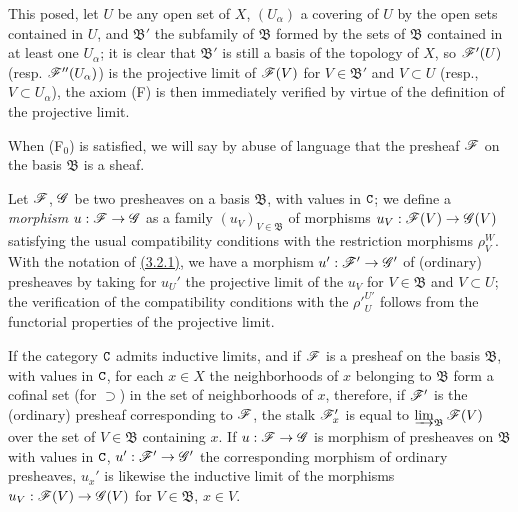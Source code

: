 \begin{env}[3.2.2]
This posed, let $U$ be any open set of $X$, $(U_\alpha)$ a covering of $U$ by
the open sets contained in $U$, and $\mathfrak{B}'$ the subfamily of
$\mathfrak{B}$ formed by the sets
of $\mathfrak{B}$ contained in at least one $U_\alpha$; it is clear that
$\mathfrak{B}'$ is still a basis of the topology of $X$, so $\mathscr{F}'(U)$
(resp. $\mathscr{F}''(U_\alpha)$) is the projective limit of $\mathscr{F}(V)$ for
$V\in\mathfrak{B}'$ and $V\subset U$ (resp., $V\subset U_\alpha$), the axiom (F)
is then immediately verified by virtue of the definition of the projective
limit.

When (F$_0$) is satisfied, we will say by abuse of language that the presheaf
$\mathscr{F}$ on the basis $\mathfrak{B}$ is a sheaf.
\end{env}

\begin{env}[3.2.3]
\label{env-0.3.2.3}
Let $\mathscr{F}$, $\mathscr{G}$ be two presheaves on a basis $\mathfrak{B}$, with values
in $\mathtt{C}$; we define a {\em morphism} $u:\mathscr{F}\to\mathscr{G}$ as a family
$(u_V)_{V\in\mathfrak{B}}$ of morphisms $u_V:\mathscr{F}(V)\to\mathscr{G}(V)$ satisfying
the usual compatibility conditions with the restriction morphisms $\rho_V^W$.
With the notation of \hyperref[env-0.3.2.1]{(3.2.1)}, we have a morphism
$u':\mathscr{F}'\to\mathscr{G}'$ of (ordinary) presheaves by taking for $u_U'$ the
projective limit of the $u_V$ for $V\in\mathfrak{B}$ and $V\subset U$; the
verification of the compatibility conditions with the ${\rho'}_U^{U'}$ follows
from the functorial properties of the projective limit.
\end{env}

\begin{env}[3.2.4]
\label{env-0.3.2.4}
If the category $\mathtt{C}$ admits inductive limits, and if $\mathscr{F}$ is a presheaf on
the basis $\mathfrak{B}$, with values in $\mathtt{C}$, for each $x\in X$ the
neighborhoods of $x$ belonging to $\mathfrak{B}$ form a cofinal set
(for $\supset$) in the set of neighborhoods of $x$, therefore, if $\mathscr{F}'$ is
the (ordinary) presheaf corresponding to $\mathscr{F}$, the stalk $\mathscr{F}_x'$ is
equal to $\varinjlim_{\mathfrak{B}}\mathscr{F}(V)$ over the set of $V\in\mathfrak{B}$
containing $x$. If $u:\mathscr{F}\to\mathscr{G}$ is morphism of presheaves on
$\mathfrak{B}$ with values in $\mathtt{C}$, $u':\mathscr{F}'\to\mathscr{G}'$ the corresponding
morphism of ordinary presheaves, $u_x'$ is likewise the inductive limit of the
morphisms $u_V:\mathscr{F}(V)\to\mathscr{G}(V)$ for $V\in\mathfrak{B}$, $x\in V$.
\end{env}

